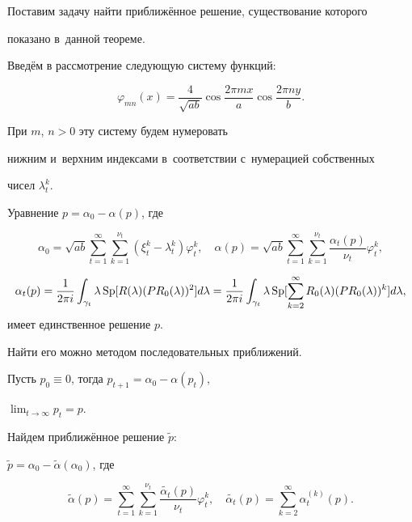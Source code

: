Поставим задачу найти приближённое решение,  существование которого

показано в~данной теореме.





Введём в рассмотрение следующую систему функций: 

$$

\varphi_{mn}(x)=\frac4{\sqrt{ab}}\cos \frac{2\pi mx}{a}\cos

\frac{2\pi ny}{b}.

$$  

При $m$,  $n>0$ эту систему будем нумеровать

нижним и~верхним индексами в~соответствии с~нумерацией собственных

чисел $\lambda_t^k$.



Уравнение $p=\alpha_0-\alpha(p)$,  где

$$\alpha_0=\sqrt{ab}\sum_{t=1}^\infty\sum_{k=1}^{\nu_t}(\xi_t^k-\lambda_t^k)\varphi_t^k, \quad

\alpha(p)=\sqrt{ab}\sum_{t=1}^\infty\sum_{k=1}^{\nu_t}\frac{\alpha_t(p)}{\nu_t}\varphi_t^k ,$$

$$\alpha_t(p)=\frac{1}{2\pi i}\int_{\gamma_t}\lambda \mathop{\rm

Sp} [R(\lambda)(PR_0(\lambda))^2]d\lambda=\frac{1}{2\pi

i}\int_{\gamma_t}\lambda\mathop{\rm Sp} [\sum_{k=2}^\infty R_0(\lambda)

(PR_0(\lambda))^k]d\lambda ,$$ имеет единственное решение $p$.



Найти его можно методом последовательных приближений.



Пусть $p_0\equiv0$,  тогда $p_{t+1}=\alpha_0-\alpha(p_t) $, 

$\lim_{t\rightarrow\infty}

p_t=p $. 



Найдем приближённое решение $\widetilde{p}$:

$\widetilde{p}=\alpha_0-\widetilde{\alpha}(\alpha_0) $,  где



$$\widetilde{\alpha}(p)=\sum_{t=1}^\infty\sum_{k=1}^{\nu_t}\frac{\widetilde{\alpha_t}(p)}{\nu_t}\varphi_t^k, \quad

 \widetilde{\alpha_t}(p)=\sum_{k=2}^\infty\alpha_t^{(k)}(p). $$ 

